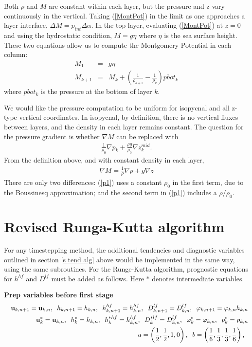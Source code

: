 \documentclass[11pt]{report}
\newcommand{\bea}{\begin{eqnarray}}
\newcommand{\eea}{\end{eqnarray}}
\begin{document}
Both $\rho$ and $M$ are constant within each layer, but the pressure and z vary continuously in the vertical.  Taking (\ref{MontPot}) in the limit as one approaches a layer interface, $\Delta M =  p_{int} \Delta \alpha$.  In the top layer, evaluating (\ref{MontPot}) at $z=0$ and using the hydrostatic condition, $M=g\eta$ where $\eta$ is the sea surface height.  These two equations allow us to compute the Montgomery Potential in each column:
\begin{eqnarray}
M_1 &=& g\eta \\
M_{k+1} &=& M_k + \left( \frac{1}{\rho_{k+1}} - \frac{1}{\rho_{k}}\right) pbot_k
\end{eqnarray}
where $pbot_k$ is the pressure at the bottom of layer $k$.

We would like the pressure computation to be uniform for isopycnal and all z-type vertical coordinates.  In isopycnal, by definition, there is no vertical fluxes between layers, and the density in each layer remains constant.  The question for the pressure gradient is whether $\nabla M$ can be replaced with 
\bea
 \frac{1}{\rho_0}\nabla p_k  + \frac{\rho g}{\rho_0}\nabla z^{mid}_k. \label{p1}
\eea
From the definition above, and with constant density in each layer,
\bea
\nabla M = \frac{1}{\rho} \nabla p + g\nabla z \label{p2}
\eea
There are only two differences:  (\ref{p1}) uses a constant $\rho_0$ in the first term, due to the Boussinesq approximation; and the second term in (\ref{p1}) includes a $\rho/\rho_0$.

\newpage
\section{Revised Runga-Kutta algorithm}

For any timestepping method, the additional tendencies and diagnostic variables outlined in section \ref{s tend alg} above would be implemented in the same way, using the same subroutines.  For the Runge-Kutta algorithm, prognostic equations for $h^{hf}$ and $D^{lf}$ must be added as follows.  Here $*$ denotes intermediate variables.

{\bf Prep variables before first stage}
\begin{eqnarray} &&
{\bf u}_{k,n+1}={\bf u}_{k,n}, \;\;
h_{k,n+1}=h_{k,n},\;\;
h^{hf}_{k,n+1}=h^{hf}_{k,n},\;\;
D^{lf}_{k,n+1}=D^{lf}_{k,n},\;\;
{\varphi}_{k,n+1} = {\varphi}_{k,n} h_{k,n}
\\&&
{\bf u}_k^*={\bf u}_{k,n}, \;\;
h_k^*=h_{k,n},\;\;
h^{*hf}_k=h^{hf}_{k,n},\;\;
D^{*lf}_k=D^{lf}_{k,n},\;\;
{\varphi}_k^* = {\varphi}_{k,n}, \;\;
p_k^*=p_{k,n}
\\&&
a = \left(\frac{1}{2},\frac{1}{2},1,0 \right),\;\;
b = \left(\frac{1}{6},\frac{1}{3},\frac{1}{3},\frac{1}{6}\right),\;\;
\end{eqnarray}
\end{document}
